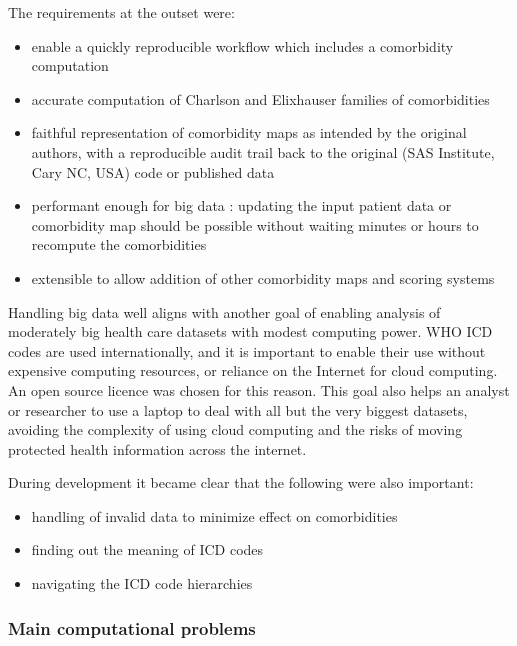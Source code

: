 \documentclass[article]{jss}
\providecommand{\tightlist}{%
  \setlength{\itemsep}{0pt}\setlength{\parskip}{0pt}}
\begin{document}
The requirements at the outset were:

\begin{itemize}
\tightlist
\item
  enable a quickly reproducible workflow which includes a comorbidity
  computation
\item
  accurate computation of Charlson and Elixhauser families of
  comorbidities
\item
  faithful representation of comorbidity maps as intended by the
  original authors, with a reproducible audit trail back to the original
   (SAS Institute, Cary NC, USA) code or published data
\item
  performant enough for big data \citep{simpao_big_2015}: updating the
  input patient data or comorbidity map should be possible without
  waiting minutes or hours to recompute the comorbidities
\item
  extensible to allow addition of other comorbidity maps and scoring
  systems
\end{itemize}

Handling big data well aligns with another goal of enabling analysis of
moderately big health care datasets with modest computing power. WHO ICD
codes are used internationally, and it is important to enable their use
without expensive computing resources, or reliance on the Internet for
cloud computing. An open source licence
\citep[GNU General Public License v3.0][]{gplv3} was chosen for this
reason. This goal also helps an analyst or researcher to use a laptop to
deal with all but the very biggest datasets, avoiding the complexity of
using cloud computing and the risks of moving protected health
information across the internet.

During development it became clear that the following were also
important:

\begin{itemize}
\tightlist
\item
  handling of invalid data to minimize effect on comorbidities
\item
  finding out the meaning of ICD codes
\item
  navigating the ICD code hierarchies
\end{itemize}

\subsubsection{Main computational
problems}\label{main-computational-problems}
\end{document}
